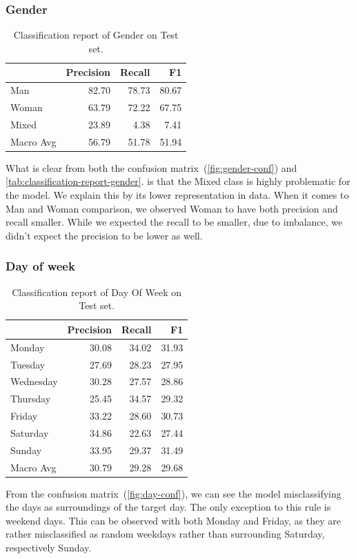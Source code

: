 \subsubsection{Gender}
\begin{table}[H]
    \centering\footnotesize\sf
    \begin{tabular}{lrrr}
        \toprule
        {}        & Precision & Recall & F1    \\
        \midrule
        Man       & 82.70     & 78.73  & 80.67 \\
        Woman     & 63.79     & 72.22  & 67.75 \\
        Mixed     & 23.89     & 4.38   & 7.41  \\
        Macro Avg & 56.79     & 51.78  & 51.94 \\
        \bottomrule
    \end{tabular}
    \caption{Classification report of Gender on Test set.}
    \label{tab:classification-report-gender}
\end{table}
What is clear from both the confusion matrix~(\autoref{fig:gender-conf}) and \autoref{tab:classification-report-gender}.
is that the Mixed class is highly problematic for the model. We explain this by its
lower representation in data. When it comes to Man and Woman comparison,
we observed Woman to have both precision and recall smaller. While we expected
the recall to be smaller, due to imbalance, we didn't expect the precision to be
lower as well.

\subsubsection{Day of week}
\begin{table}[H]
    \centering\footnotesize\sf
    \begin{tabular}{lrrr}
        \toprule
        {}        & Precision & Recall & F1    \\
        \midrule
        Monday    & 30.08     & 34.02  & 31.93 \\
        Tuesday   & 27.69     & 28.23  & 27.95 \\
        Wednesday & 30.28     & 27.57  & 28.86 \\
        Thursday  & 25.45     & 34.57  & 29.32 \\
        Friday    & 33.22     & 28.60  & 30.73 \\
        Saturday  & 34.86     & 22.63  & 27.44 \\
        Sunday    & 33.95     & 29.37  & 31.49 \\
        Macro Avg & 30.79     & 29.28  & 29.68 \\
        \bottomrule
    \end{tabular}
    \caption{Classification report of Day Of Week on Test set.}
    \label{tab:classification-report-day}
\end{table}
From the confusion matrix~(\autoref{fig:day-conf}), we can see the model misclassifying the days
as surroundings of the target day. The only exception to this rule
is weekend days. This can be observed with both Monday and Friday, as they are
rather misclassified as random weekdays rather than surrounding Saturday, respectively
Sunday.



